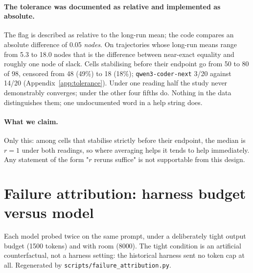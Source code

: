 \documentclass{article}
\begin{document}
\paragraph{The tolerance was documented as relative and implemented as absolute.}
The flag is described as relative to the long-run mean; the code compares an absolute difference of 0.05 \emph{nodes}. On trajectories whose long-run means range from 5.3 to 18.0 nodes that is the difference between near-exact equality and roughly one node of slack. Cells stabilising before their endpoint go from 50 to 80 of 98, censored from 48 (49\%) to 18 (18\%); \texttt{qwen3-coder-next} 3/20 against 14/20 (Appendix~\ref{app:tolerance}). Under one reading half the study never demonstrably converges; under the other four fifths do. Nothing in the data distinguishes them; one undocumented word in a help string does.

\paragraph{What we claim.}
Only this: among cells that stabilise strictly before their endpoint, the median is $r=1$ under both readings, so where averaging helps it tends to help immediately. Any statement of the form "$r$ reruns suffice" is not supportable from this design.

\section{Failure attribution: harness budget versus model}
\label{app:attribution}
Each model probed twice on the same prompt, under a deliberately tight output budget (1500 tokens) and with room (8000). The tight condition is an artificial counterfactual, not a harness setting: the historical harness sent no token cap at all. Regenerated by \texttt{scripts/failure\_attribution.py}.
\end{document}
